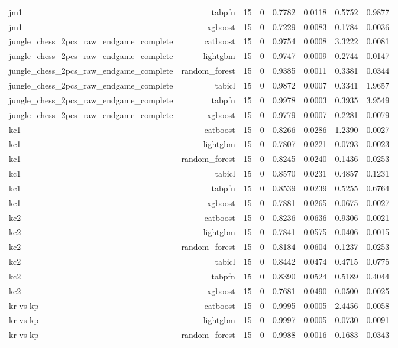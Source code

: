 \begin{table}[htbp]
\begin{tabular}{lrrrrrrr}
jm1 & tabpfn & 15 & 0 & 0.7782 & 0.0118 & 0.5752 & 0.9877 \\
jm1 & xgboost & 15 & 0 & 0.7229 & 0.0083 & 0.1784 & 0.0036 \\
jungle\_chess\_2pcs\_raw\_endgame\_complete & catboost & 15 & 0 & 0.9754 & 0.0008 & 3.3222 & 0.0081 \\
jungle\_chess\_2pcs\_raw\_endgame\_complete & lightgbm & 15 & 0 & 0.9747 & 0.0009 & 0.2744 & 0.0147 \\
jungle\_chess\_2pcs\_raw\_endgame\_complete & random\_forest & 15 & 0 & 0.9385 & 0.0011 & 0.3381 & 0.0344 \\
jungle\_chess\_2pcs\_raw\_endgame\_complete & tabicl & 15 & 0 & 0.9872 & 0.0007 & 0.3341 & 1.9657 \\
jungle\_chess\_2pcs\_raw\_endgame\_complete & tabpfn & 15 & 0 & 0.9978 & 0.0003 & 0.3935 & 3.9549 \\
jungle\_chess\_2pcs\_raw\_endgame\_complete & xgboost & 15 & 0 & 0.9779 & 0.0007 & 0.2281 & 0.0079 \\
kc1 & catboost & 15 & 0 & 0.8266 & 0.0286 & 1.2390 & 0.0027 \\
kc1 & lightgbm & 15 & 0 & 0.7807 & 0.0221 & 0.0793 & 0.0023 \\
kc1 & random\_forest & 15 & 0 & 0.8245 & 0.0240 & 0.1436 & 0.0253 \\
kc1 & tabicl & 15 & 0 & 0.8570 & 0.0231 & 0.4857 & 0.1231 \\
kc1 & tabpfn & 15 & 0 & 0.8539 & 0.0239 & 0.5255 & 0.6764 \\
kc1 & xgboost & 15 & 0 & 0.7881 & 0.0265 & 0.0675 & 0.0027 \\
kc2 & catboost & 15 & 0 & 0.8236 & 0.0636 & 0.9306 & 0.0021 \\
kc2 & lightgbm & 15 & 0 & 0.7841 & 0.0575 & 0.0406 & 0.0015 \\
kc2 & random\_forest & 15 & 0 & 0.8184 & 0.0604 & 0.1237 & 0.0253 \\
kc2 & tabicl & 15 & 0 & 0.8442 & 0.0474 & 0.4715 & 0.0775 \\
kc2 & tabpfn & 15 & 0 & 0.8390 & 0.0524 & 0.5189 & 0.4044 \\
kc2 & xgboost & 15 & 0 & 0.7681 & 0.0490 & 0.0500 & 0.0025 \\
kr-vs-kp & catboost & 15 & 0 & 0.9995 & 0.0005 & 2.4456 & 0.0058 \\
kr-vs-kp & lightgbm & 15 & 0 & 0.9997 & 0.0005 & 0.0730 & 0.0091 \\
kr-vs-kp & random\_forest & 15 & 0 & 0.9988 & 0.0016 & 0.1683 & 0.0343 \\

\end{tabular}
\end{table}
